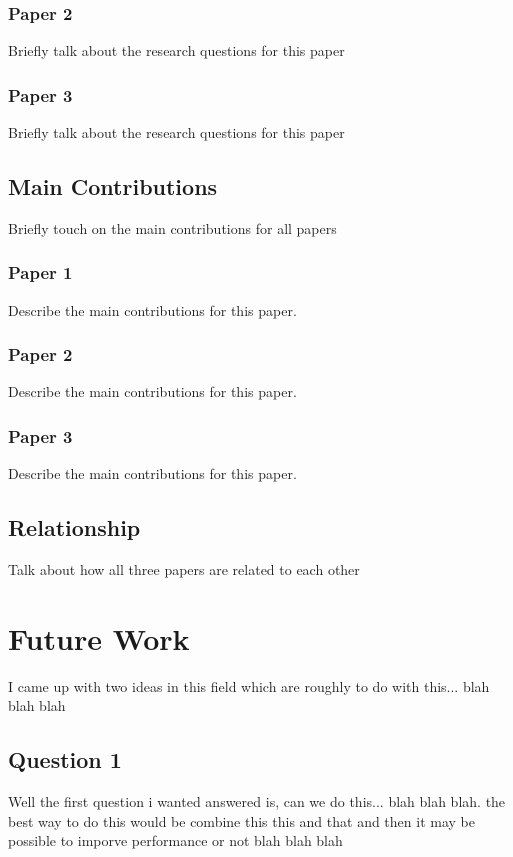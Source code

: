 \documentclass{acm_proc_article-sp}
\begin{document}
\subsubsection{Paper 2}
Briefly talk about the research questions for this paper

\subsubsection{Paper 3}
Briefly talk about the research questions for this paper

\subsection{Main Contributions}
Briefly touch on the main contributions for all papers
\subsubsection{Paper 1}
Describe the main contributions for this paper.

\subsubsection{Paper 2}
Describe the main contributions for this paper.

\subsubsection{Paper 3}
Describe the main contributions for this paper.

\subsection{Relationship}
Talk about how all three papers are related to each other

\section{Future Work}
I came up with two ideas in this field which are roughly to do with this... blah blah blah

\subsection{Question 1}
Well the first question i wanted answered is, can we do this... blah blah blah. the best way to do this would be combine this this and that and then it may be possible to imporve performance or not blah blah blah
\end{document}
